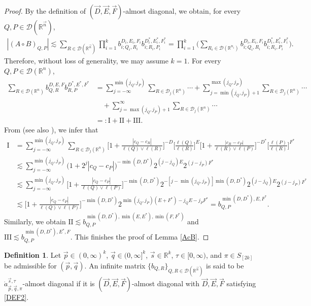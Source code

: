 \documentclass[11pt, reqno]{amsart}
\theoremstyle{definition}
\newtheorem{definition}[theorem]{Definition}
\theoremstyle{remark}
\numberwithin{equation}{section}
\newcommand{\R}{\mathbb R}
\newcommand{\vp}{\vec p}
\newcommand{\vq}{\vec q}
\newcommand{\vs}{\vec s}
\newcommand{\abs}[1]{|#1|}
\begin{document}
\begin{proof}
By the definition of $(\vec D,\vec E,\vec F)$-almost diagonal, we obtain,
for every $Q,P\in\mathscr{D}(\mathbb R^{\vec n})$,
\begin{align*}
|(A\circ B)_{Q,P}|
\lesssim \sum_{R\in\mathscr{D}(\mathbb R^{\vec n})}
\prod_{i=1}^k b^{D_i,E_i,F_i}_{i;Q_i,R_i}
b^{D_i^*,E_i^*,F_i^*}_{i;R_i,P_i}
= \prod_{i=1}^k \Bigg( \sum_{R_i\in\mathscr{D}(\mathbb R^{n_i})}
b^{D_i,E_i,F_i}_{i;Q_i,R_i}
b^{D_i^*,E_i^*,F_i^*}_{i;R_i,P_i} \Bigg).
\end{align*}
Therefore, without loss of generality, we may assume $k=1$.
For every $Q,P\in\mathscr{D}(\mathbb R^n)$,
\begin{align*}
\sum_{R\in\mathscr{D}(\mathbb R^n)}
b^{D,E,F}_{Q,R} b^{D^*,E^*,F^*}_{R,P}
&=\sum_{j=-\infty}^{\min(j_Q,j_P)}
\sum_{R\in\mathscr{D}_j(\mathbb R^n)} \cdots
+\sum_{j=\min(j_Q,j_P)+1}^{\max(j_Q,j_P)}
\sum_{R\in\mathscr{D}_j(\mathbb R^n)}\cdots \\
&\quad +\sum_{j=\max(j_Q,j_P)+1}^{\infty}
\sum_{R\in\mathscr{D}_j(\mathbb R^n)} \cdots\\
&=:\mathrm{I}+\mathrm{II}+\mathrm{III}.
\end{align*}
From \cite[Appendix B.1]{Graf-mod}
(see also \cite[Lemma 3.6]{BHYY:2b}), we infer that
\begin{align*}
\mathrm{I}
&= \sum_{j=-\infty}^{\min(j_Q,j_P)}
\sum_{R\in\mathscr{D}_j(\mathbb R^n)} \bigg[1+\frac{\abs{c_Q-c_R}}{\ell(Q)\vee\ell(R)}\bigg]^{-D}
\bigg[\frac{\ell(Q)}{\ell(R)}\bigg]^E
\bigg[1+\frac{\abs{c_R-c_P}}{\ell(R)\vee\ell(P)}\bigg]^{-D^*}
\bigg[\frac{\ell(P)}{\ell(R)}\bigg]^{F^*}\\
&\lesssim \sum_{j=-\infty}^{\min(j_Q,j_P)} \Big(1+2^j\abs{c_Q-c_P}\Big)^{-\min(D,D^*)}
2^{(j-j_Q)E} 2^{(j-j_P)F^*} \\
&\lesssim \sum_{j=-\infty}^{\min(j_Q,j_P)} \bigg[1+\frac{\abs{c_Q-c_P}}{\ell(Q)\vee\ell(P)}\bigg]^{-\min(D,D^*)}
2^{-[j-\min(j_Q,j_P)]\min(D,D^*)} 2^{(j-j_Q)E} 2^{(j-j_P)F^*} \\
&\lesssim \bigg[1+\frac{\abs{c_Q-c_P}}{\ell(Q)\vee\ell(P)}\bigg]^{-\min(D,D^*)}
2^{\min(j_Q,j_P)(E+F^*)-j_QE-j_PF^*}
= b^{\min(D,D^*),E,F^*}_{Q,P}.
\end{align*}
Similarly, we obtain $\mathrm{II}\lesssim b^{\min(D,D^*),\min(E,E^*),\min(F,F^*)}_{Q,P}$
and $\mathrm{III}\lesssim b^{\min(D,D^*),E^*,F}_{Q,P}$.
This finishes the proof of Lemma \ref{AcB}.
\end{proof}

\begin{definition}\label{astAD}
Let $\vp\in(0,\infty)^k$, $\vq\in(0,\infty]^k$, $\vs\in\R^k$,
$\tau\in[0,\infty)$, and $\pi\in S_{[2k]}$ be admissible for $(\vp,\vq)$.
An infinite matrix $\{b_{Q,R}\}_{Q,R\in\mathscr D(\mathbb R^{\vec n})}$
is said to be $\dot a^{\vec s,\tau}_{\vec p,\vec q,\pi}$-almost diagonal if it is $(\vec D,\vec E,\vec F)$-almost diagonal with
$\vec D,\vec E,\vec F$ satisfying \eqref{DEF2}.
\end{definition}
\end{document}
